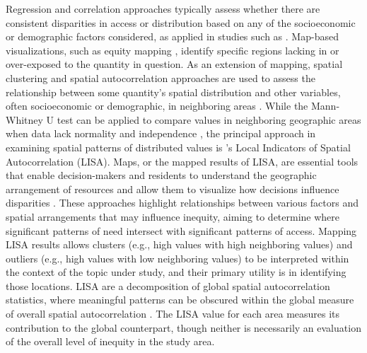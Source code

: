 \documentclass[final,3p,times,onecolumn,sort&compress]{elsarticle}
\begin{document}
Regression and correlation approaches typically assess whether there are consistent disparities in access or distribution based on any of the socioeconomic or demographic factors considered, as applied in studies such as \cite{Schwarz2015-fs, Nesbitt2019-sk, Kim2016-mc, Williams2020-greenspace, Apparicio2007-di}.
Map-based visualizations, such as equity mapping \citep{Talen1998-fl, Wolch2005-wz}, identify specific regions lacking in or over-exposed to the quantity in question.
As an extension of mapping, spatial clustering and spatial autocorrelation approaches are used to assess the relationship between some quantity’s spatial distribution and other variables, often socioeconomic or demographic, in neighboring areas \citep{Talen1997-gl, Smoyer-Tomic2004-eh,Garcia2020-xt}.
While the Mann-Whitney U test can be applied to compare values in neighboring geographic areas when data lack normality and independence \citep{Nicholls2001-pf}, the principal approach in examining spatial patterns of distributed values is \cite{Anselin1995-fh}'s Local Indicators of Spatial Autocorrelation (LISA). 
Maps, or the mapped results of LISA, are essential tools that enable decision-makers and residents to understand the geographic arrangement of resources and allow them to visualize how decisions influence disparities \citep{Talen1998-fl}.
These approaches highlight relationships between various factors and spatial arrangements that may influence inequity, aiming to determine where significant patterns of need intersect with significant patterns of access. 
Mapping LISA results allows clusters (e.g., high values with high neighboring values) and outliers (e.g., high values with low neighboring values) to be interpreted within the context of the topic under study, and their primary utility is in identifying those locations. 
LISA are a decomposition of global spatial autocorrelation statistics, where meaningful patterns can be obscured within the global measure of overall spatial autocorrelation \citep{Talen1998-mk}. 
The LISA value for each area measures its contribution to the global counterpart, though neither is necessarily an evaluation of the overall level of inequity in the study area.
\end{document}
